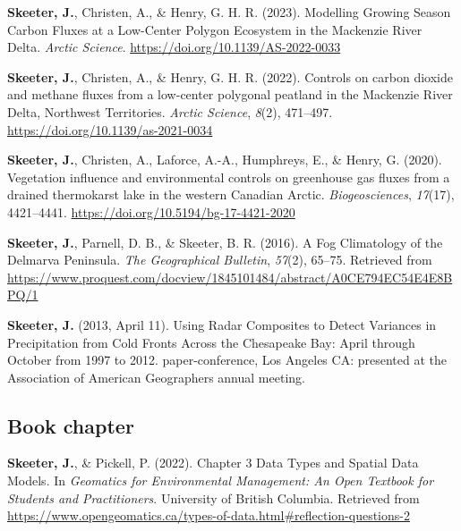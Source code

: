 \documentclass[
]{article}
\newlength{\cslhangindent}
\newlength{\cslentryspacingunit} %
\newenvironment{CSLReferences}[2] %
 {%
  \setlength{\parindent}{0pt}
  \ifodd #1
  \let\oldpar\par
  \def\par{\hangindent=\cslhangindent\oldpar}
  \fi
  \setlength{\parskip}{#2\cslentryspacingunit}
 }%
 {}
\begin{document}
\hypertarget{refs-3.1}{}
\begin{CSLReferences}{1}{0}
\leavevmode{}%
\textbf{Skeeter, J.}, Christen, A., \& Henry, G. H. R. (2023). Modelling
Growing Season Carbon Fluxes at a Low-Center Polygon Ecosystem in the
Mackenzie River Delta. \emph{Arctic Science}.
\url{https://doi.org/10.1139/AS-2022-0033}

\leavevmode{}%
\textbf{Skeeter, J.}, Christen, A., \& Henry, G. H. R. (2022). Controls
on carbon dioxide and methane fluxes from a low-center polygonal
peatland in the Mackenzie River Delta, Northwest Territories.
\emph{Arctic Science}, \emph{8}(2), 471--497.
\url{https://doi.org/10.1139/as-2021-0034}

\leavevmode{}%
\textbf{Skeeter, J.}, Christen, A., Laforce, A.-A., Humphreys, E., \&
Henry, G. (2020). Vegetation influence and environmental controls on
greenhouse gas fluxes from a drained thermokarst lake in the western
Canadian Arctic. \emph{Biogeosciences}, \emph{17}(17), 4421--4441.
\url{https://doi.org/10.5194/bg-17-4421-2020}

\leavevmode{}%
\textbf{Skeeter, J.}, Parnell, D. B., \& Skeeter, B. R. (2016). A Fog
Climatology of the Delmarva Peninsula. \emph{The Geographical Bulletin},
\emph{57}(2), 65--75. Retrieved from
\url{https://www.proquest.com/docview/1845101484/abstract/A0CE794EC54E4E8BPQ/1}

\leavevmode{}%
\textbf{Skeeter, J.} (2013, April 11). Using Radar Composites to Detect
Variances in Precipitation from Cold Fronts Across the Chesapeake Bay:
April through October from 1997 to 2012. paper-conference, Los Angeles
CA: presented at the Association of American Geographers annual meeting.

\end{CSLReferences}

\hypertarget{book-chapter}{%
\subsection{Book chapter}\label{book-chapter}}

\hypertarget{refs-3.2}{}
\begin{CSLReferences}{1}{0}
\leavevmode{}%
\textbf{Skeeter, J.}, \& Pickell, P. (2022). Chapter 3 Data Types and
Spatial Data Models. In \emph{Geomatics for Environmental Management: An
Open Textbook for Students and Practitioners}. University of British
Columbia. Retrieved from
\url{https://www.opengeomatics.ca/types-of-data.html\#reflection-questions-2}

\end{CSLReferences}
\end{document}
